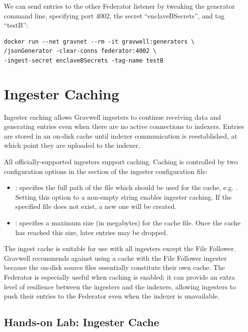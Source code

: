 We can send entries to the other Federator listener by tweaking the generator command line, specifying port 4002, the secret ``enclaveBSecrets'', and tag ``testB'':

\begin{Verbatim}[breaklines=true]
docker run --net gravnet --rm -it gravwell:generators \
/jsonGenerator -clear-conns federator:4002 \
-ingest-secret enclaveBSecrets -tag-name testB
\end{Verbatim}

\section{Ingester Caching}

Ingester caching allows Gravwell ingesters to continue receiving data
and generating entries even when there are no active connections to
indexers. Entries are stored in an on-disk cache until indexer
communication is reestablished, at which point they are uploaded to the
indexer.

All officially-supported ingesters support caching. Caching is
controlled by two configuration options in the \code{[Global]} section of
the ingester configuration file:

\begin{itemize}
\item
  : specifies the full path of the file which should
  be used for the cache, e.g.
  \code{/opt/gravwell/cache/file\_follow.cache}. Setting this option to a
  non-empty string enables ingester caching. If the specified file does
  not exist, a new one will be created.
\item
  : specifies a maximum size (in megabytes) for the
  cache file. Once the cache has reached this size, later entries may be
  dropped.
\end{itemize}

The ingest cache is suitable for use with all ingesters except the File
Follower. Gravwell recommends against using a cache with the File
Follower ingester because the on-disk source files essentially
constitute their own cache. The Federator is especially useful when
caching is enabled; it can provide an extra level of resilience between
the ingesters and the indexers, allowing ingesters to push their entries
to the Federator even when the indexer is unavailable.

\subsection{Hands-on Lab: Ingester Cache}

